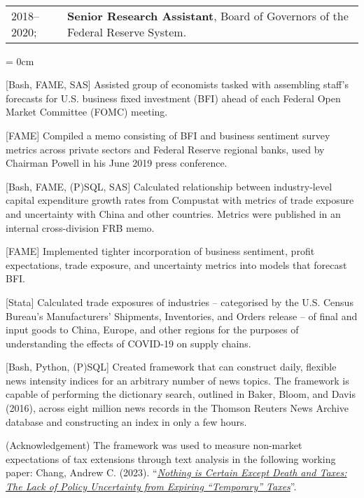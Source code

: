 \documentclass[a4paper, 10pt]{article}
\begin{document}
  ~\begin{tabular}{ll}
    2018--2020; & \textbf{Senior Research Assistant}, Board of Governors of the Federal Reserve System.
  \end{tabular}
  \begin{compactitem}\parskip = 0cm
    \item {[Bash, FAME, SAS]} Assisted group of economists tasked with assembling staff's forecasts for U.S. business fixed investment (BFI) ahead of each Federal Open Market Committee (FOMC) meeting.
    \item {[FAME]} Compiled a memo consisting of BFI and business sentiment survey metrics across private sectors and Federal Reserve regional banks, used by Chairman Powell in his June 2019 press conference.
    \item {[Bash, FAME, (P)SQL, SAS]} Calculated relationship between industry-level capital expenditure growth rates from Compustat with metrics of trade exposure and uncertainty with China and other countries. Metrics were published in an internal cross-division FRB memo.
    \item {[FAME]} Implemented tighter incorporation of business sentiment, profit expectations, trade exposure, and uncertainty metrics into models that forecast BFI.
    \item {[Stata]} Calculated trade exposures of industries -- categorised by the U.S. Census Bureau's Manufacturers' Shipments, Inventories, and Orders release -- of final and input goods to China, Europe, and other regions for the purposes of understanding the effects of COVID-19 on supply chains.
    \item {[Bash, Python, (P)SQL]} Created framework that can construct daily, flexible news intensity indices for an arbitrary number of news topics. The framework is capable of performing the dictionary search, outlined in Baker, Bloom, and Davis (2016), across eight million news records in the Thomson Reuters News Archive database and constructing an index in only a few hours.
    \begin{compactitem}
      \item {(Acknowledgement)} The framework was used to measure non-market expectations of tax extensions through text analysis in the following working paper: Chang, Andrew C. (2023). ``\href{https://drive.google.com/file/d/1ipHYM7oGXl9A5VQJqe9VwLM4ZMVJYsC9/view}{\textit{Nothing is Certain Except Death and Taxes: The Lack of Policy Uncertainty from Expiring ``Temporary'' Taxes}}''.
    \end{compactitem}

\end{compactitem}
\end{document}
